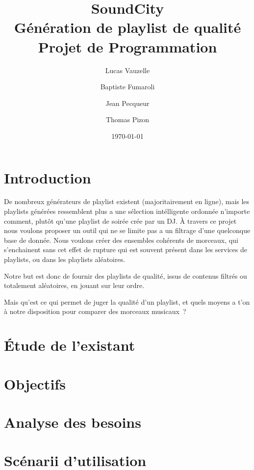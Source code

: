 \documentclass[a4paper, 11pt]{memoir}
\title{
  \huge{SoundCity} \\
  Génération de playlist de qualité \\
  Projet de Programmation
}
\author{Lucas Vauzelle \and Baptiste Fumaroli \and Jean Pecqueur \and Thomas Pizon}
\date{\today}
\begin{document}
\maketitle %
\clearpage

\frontmatter*

\chapter*{Introduction}

De nombreux générateurs de playlist existent (majoritairement en ligne), mais
les playlists générées ressemblent plus a une sélection intélligente ordonnée
n'importe comment, plutôt qu'une playlist de soirée crée par un DJ. À travers
ce projet nous voulons proposer un outil qui ne se limite pas a un filtrage
d'une quelconque base de donnée. Nous voulons créer des ensembles cohérents de
morceaux, qui s'enchainent sans cet effet de rupture qui est souvent présent
dans les services de playlists, ou dans les playlists aléatoires.

Notre but est donc de fournir des playlists de qualité, issus de contenus
filtrés ou totalement aléatoires, en jouant sur leur ordre.

Mais qu'est ce qui permet de juger la qualité d'un playlist, et quels moyens
a t'on à notre disposition pour comparer des morceaux musicaux~?

\clearpage

\tableofcontents

\mainmatter*

\chapter{Étude de l'existant}

\chapter{Objectifs}

\chapter{Analyse des besoins}

\chapter{Scénarii d'utilisation}
\end{document}
